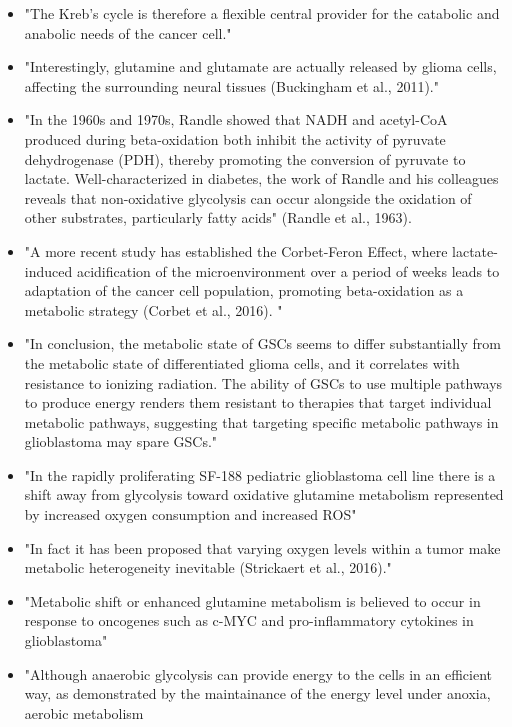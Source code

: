\documentclass[11pt,a4paper]{article}
\begin{document}
\begin{itemize}
\item "The Kreb's cycle is therefore a flexible central provider for the catabolic and anabolic needs of the cancer cell." \cite{Strickland2017}
\item "Interestingly, glutamine and glutamate are actually released by glioma cells, affecting the surrounding neural tissues (Buckingham et al., 2011)."\cite{Strickland2017}
\item "In the 1960s and 1970s, Randle showed that NADH and acetyl-CoA produced during beta-oxidation both inhibit the activity of pyruvate dehydrogenase (PDH), thereby promoting the conversion of pyruvate to lactate. Well-characterized in diabetes, the work of Randle and his colleagues reveals that non-oxidative glycolysis can occur alongside the oxidation of other substrates, particularly fatty acids" (Randle et al., 1963).\cite{Strickland2017}
\item "A more recent study has established the Corbet-Feron Effect, where lactate-induced acidification of the microenvironment over a period of weeks leads to adaptation of the cancer cell population, promoting beta-oxidation as a metabolic strategy (Corbet et al., 2016). "\cite{Strickland2017}
\item "In conclusion, the metabolic state of GSCs seems to differ substantially from the metabolic state of differentiated glioma cells, and it correlates with resistance to ionizing radiation. The ability of GSCs to use multiple pathways to produce energy renders them resistant to therapies that target individual metabolic pathways, suggesting that targeting specific metabolic pathways in glioblastoma may spare GSCs."\cite{Vlashi2011}
\item "In the rapidly proliferating SF-188 pediatric glioblastoma cell line there is a shift away from glycolysis toward oxidative glutamine metabolism represented by increased oxygen consumption and increased ROS"\cite{Strickland2017}
\item "In fact it has been proposed that varying oxygen levels within a tumor make metabolic heterogeneity inevitable (Strickaert et al., 2016)."\cite{Strickland2017}
\item "Metabolic shift or enhanced glutamine metabolism is believed to occur in response to oncogenes such as c-MYC and pro-inflammatory cytokines in glioblastoma" \cite{Stuart2023}
\item "Although anaerobic glycolysis can provide energy to the cells in an efficient way, as demonstrated by the maintainance of the energy level under anoxia, aerobic metabolism

\end{itemize}
\end{document}
